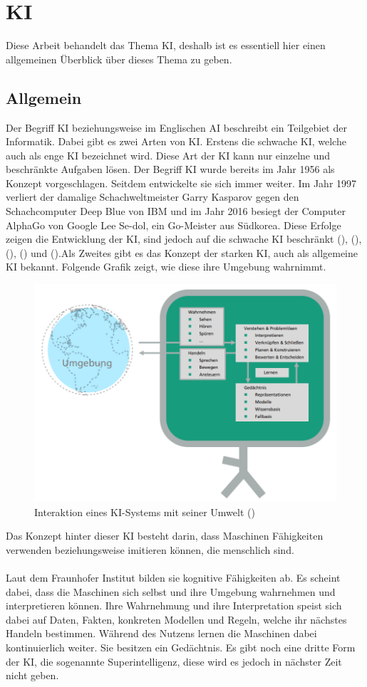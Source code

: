 \documentclass[12pt,toc=bib,toc=listof]{scrreprt}
\begin{document}
\section{KI} %
\label{sec:KI}
Diese Arbeit behandelt das Thema KI, deshalb ist es essentiell hier einen allgemeinen Überblick über dieses Thema zu geben.

\subsection{Allgemein} %
\label{sec:allgemein}
Der Begriff KI beziehungsweise im Englischen AI beschreibt ein Teilgebiet der Informatik. Dabei gibt es zwei Arten von KI. Erstens die schwache KI, welche auch als enge KI bezeichnet wird. Diese Art der KI kann nur einzelne und beschränkte Aufgaben lösen. Der Begriff KI wurde bereits im Jahr 1956 als Konzept vorgeschlagen. Seitdem entwickelte sie sich immer weiter. Im Jahr 1997 verliert der damalige Schachweltmeister Garry Kasparov gegen den Schachcomputer Deep Blue von IBM und im Jahr 2016 besiegt der Computer AlphaGo von Google Lee Se-dol, ein Go-Meister aus Südkorea. Diese Erfolge zeigen die Entwicklung der KI, sind jedoch auf die schwache KI beschränkt (\cite{Bhatt2021}), (\cite{Hecker2018}), (\cite{Mocko2021}), (\cite{Roscher2025}) und (\cite{Zhu2021}).Als Zweites gibt es das Konzept der starken KI, auch als allgemeine KI bekannt. Folgende Grafik zeigt, wie diese ihre Umgebung wahrnimmt.
\begin{figure} [H]
    \centering
    \includegraphics[width=0.75\linewidth]{./Bilder/Fraunhofer_KI-Umgebung.png}
    \caption{Interaktion eines KI-Systems mit seiner Umwelt (\cite{Hecker2018})}
    \label{fig:enter-label}
\end{figure}
\noindent Das Konzept hinter dieser KI besteht darin, dass Maschinen Fähigkeiten verwenden beziehungsweise imitieren können, die menschlich sind.\\
\\
Laut dem Fraunhofer Institut bilden sie kognitive Fähigkeiten ab.
Es scheint dabei, dass die Maschinen sich selbst und ihre Umgebung wahrnehmen und interpretieren können. Ihre Wahrnehmung und ihre Interpretation speist sich dabei auf Daten, Fakten, konkreten Modellen und Regeln, welche ihr nächstes Handeln bestimmen. Während des Nutzens lernen die Maschinen dabei kontinuierlich weiter. Sie besitzen ein Gedächtnis. Es gibt noch eine dritte Form der KI, die sogenannte Superintelligenz, diese wird es jedoch in nächster Zeit nicht geben.
\end{document}
